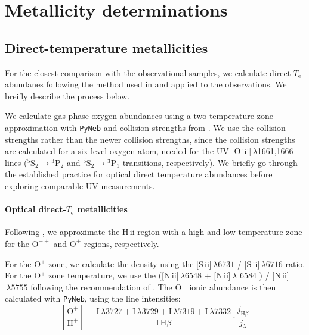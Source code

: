 \documentclass[preprint2]{aastex62}
\newcommand{\hii}{H\,{\sc ii}\xspace}
\newcommand{\nii}{[N\,{\sc ii}]\xspace}
\newcommand{\sii}{[S\,{\sc ii}]\xspace}
\newcommand{\oiii}{[O\,{\sc iii}]\xspace}
\newcommand{\Te}{\ensuremath{T_{\mathrm{e}}}\xspace}
\begin{document}
\section{Metallicity determinations}\label{sec:model:Te}

\subsection{Direct-temperature metallicities}

For the closest comparison with the observational samples, we calculate direct-\Te abundanes following the method used in \citet{Berg+2015} and applied to the \citet{Berg+2016} observations. We breifly describe the process below.

We calculate gas phase oxygen abundances using a two temperature zone approximation with {\tt PyNeb} \citep{PyNeb} and collision strengths from \citet{Aggarwal+1999}. We use the \citet{Aggarwal+1999} collision strengths rather than the newer \citet{Storey+2014} collision strengths, since the \citet{Aggarwal+1999} collision strengths are calculated for a six-level oxygen atom, needed for the UV \oiii$\,\lambda$1661,1666 lines (${}^5\mathrm{S}_2 \rightarrow {}^3\mathrm{P}_2$ and ${}^5\mathrm{S}_2 \rightarrow {}^3\mathrm{P}_1$ transitions, respectively).  We briefly go through the established practice for optical direct temperature abundances before exploring comparable UV measurements.

\paragraph{Optical direct-\Te metallicities}
Following \citet{Garnett+1999, Berg+2015}, we approximate the \hii region with a high and low temperature zone for the $\mathrm{O}^{++}$ and $\mathrm{O}^{+}$ regions, respectively.

For the O$^{+}$ zone, we calculate the density using the \sii$\,\lambda 6731$ / \sii$\,\lambda 6716$ ratio. For the O$^{+}$ zone temperature, we use the (\nii$\,\lambda$6548 $+$ \nii$\,\lambda$ 6584 ) / \nii$\,\lambda 5755$ following the recommendation of \citet{Berg+2015}. The O$^{+}$ ionic abundance is then calculated with {\tt PyNeb}, using the line intensities:
\begin{equation}
    \left[ \frac{\mathrm{O}^{+}}{\mathrm{H}^{+}} \right] = \frac{\mathrm{I}\,\lambda 3727 + \mathrm{I}\,\lambda 3729 + \mathrm{I}\,\lambda 7319 + \mathrm{I}\,\lambda 7332}{\mathrm{I}\,\mathrm{H}\beta} \cdot \frac{j_{\mathrm{H}\beta}}{j_{\lambda}}
\end{equation}
\end{document}

